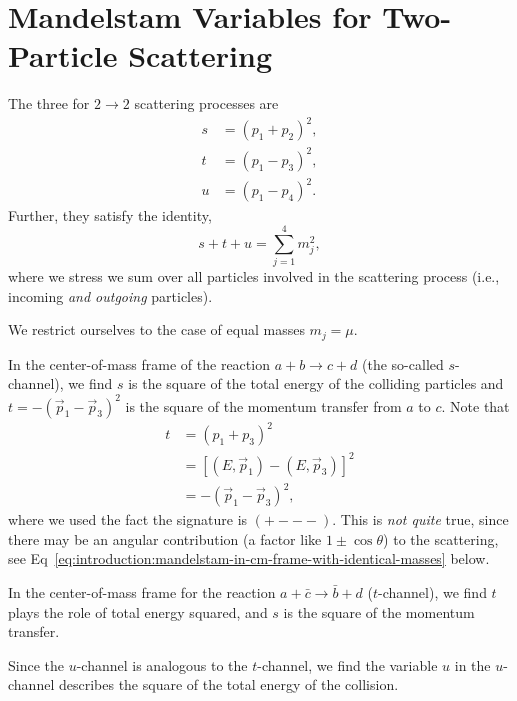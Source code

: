 \section{Mandelstam Variables for Two-Particle Scattering}

\begin{definition}
  The three  for $2\to2$ scattering
  processes are 
  \begin{subequations}
    \begin{align}
      s &= (p_{1} + p_{2})^{2},\\
      t &= (p_{1} - p_{3})^{2},\\
      u &= (p_{1} - p_{4})^{2}.
    \end{align}
  \end{subequations}
  Further, they satisfy the identity,
  \begin{equation}
s + t + u = \sum^{4}_{j=1}m_{j}^{2},
  \end{equation}
  where we stress we sum over all particles involved in the scattering
  process (i.e., incoming \emph{and outgoing} particles).
\end{definition}

 We restrict ourselves to the case of equal masses
$m_{j}=\mu$.

 In the center-of-mass frame of the reaction $a+b\to c+d$
(the so-called $s$-channel), we find $s$ is the square of the total
energy of the colliding particles and $t=-(\vec{p}_{1}-\vec{p}_{3})^{2}$
is the square of the momentum transfer from $a$ to $c$. Note that
\begin{subequations}
  \begin{align}
    t &= (p_{1} + p_{3})^{2}\\
    &= [(E,\vec{p}_{1}) - (E,\vec{p}_{3})]^{2}\\
    &= -(\vec{p}_{1}-\vec{p}_{3})^{2},
  \end{align}
\end{subequations}
where we used the fact the signature is $(+---)$. This is \emph{not quite}
true, since there may be an angular contribution (a factor like
$1\pm\cos\theta$) to the scattering, see Eq~\eqref{eq:introduction:mandelstam-in-cm-frame-with-identical-masses}
below.

In the center-of-mass frame for the reaction $a+\bar{c}\to\bar{b}+d$
($t$-channel), we find $t$ plays the role of total energy squared, and
$s$ is the square of the momentum transfer.

Since the $u$-channel is analogous to the $t$-channel, we find the
variable $u$ in the $u$-channel describes the square of the total energy
of the collision.

